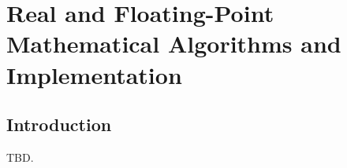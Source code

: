 \chapter{Real and Floating-Point Mathematical Algorithms and Implementation}        
\label{crma0}

\section{Introduction}
\label{crma0:sint0}

TBD.


